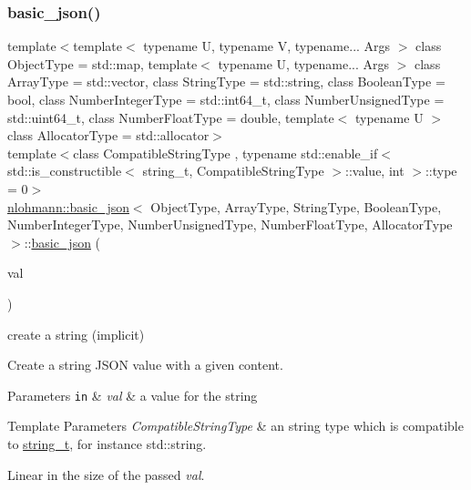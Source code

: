 \subsubsection{\texorpdfstring{basic\+\_\+json()}{basic\_json()}\hspace{0.1cm}{\footnotesize\ttfamily [9/23]}}
{\footnotesize\ttfamily template$<$template$<$ typename U, typename V, typename... Args $>$ class Object\+Type = std\+::map, template$<$ typename U, typename... Args $>$ class Array\+Type = std\+::vector, class String\+Type  = std\+::string, class Boolean\+Type  = bool, class Number\+Integer\+Type  = std\+::int64\+\_\+t, class Number\+Unsigned\+Type  = std\+::uint64\+\_\+t, class Number\+Float\+Type  = double, template$<$ typename U $>$ class Allocator\+Type = std\+::allocator$>$ \\
template$<$class Compatible\+String\+Type , typename std\+::enable\+\_\+if$<$ std\+::is\+\_\+constructible$<$ string\+\_\+t, Compatible\+String\+Type $>$\+::value, int $>$\+::type  = 0$>$ \\
\hyperlink{classnlohmann_1_1basic__json}{nlohmann\+::basic\+\_\+json}$<$ Object\+Type, Array\+Type, String\+Type, Boolean\+Type, Number\+Integer\+Type, Number\+Unsigned\+Type, Number\+Float\+Type, Allocator\+Type $>$\+::\hyperlink{classnlohmann_1_1basic__json}{basic\+\_\+json} (\begin{DoxyParamCaption}\item[{const Compatible\+String\+Type \&}]{val }\end{DoxyParamCaption})\hspace{0.3cm}{\ttfamily [inline]}}



create a string (implicit) 

Create a string J\+S\+ON value with a given content.


\begin{DoxyParams}[1]{Parameters}
\mbox{\tt in}  & {\em val} & a value for the string\\
\hline
\end{DoxyParams}

\begin{DoxyTemplParams}{Template Parameters}
{\em Compatible\+String\+Type} & an string type which is compatible to \hyperlink{classnlohmann_1_1basic__json_ab63e618bbb0371042b1bec17f5891f42}{string\+\_\+t}, for instance {\ttfamily std\+::string}.\\
\hline
\end{DoxyTemplParams}
Linear in the size of the passed {\itshape val}.



